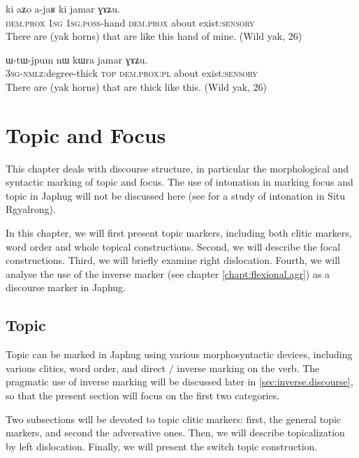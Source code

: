 \documentclass[oldfontcommands,oneside,a4paper,11pt]{memoir}
\newcommand{\ipa}[1]{{\phon #1}} %
\begin{document}
\begin{exe}
   \ex  \label{ex:ki.jamar2}
   \gll
\ipa{ki}   	\ipa{aʑo}   	\ipa{a-jaʁ}   	\ipa{ki}   	\ipa{jamar}   	\ipa{ɣɤʑu.}   \\
   \textsc{dem.prox}    \textsc{1sg} \textsc{1sg.poss}-hand   \textsc{dem.prox} about exist:\textsc{sensory} \\
\glt There are (yak horns) that are like this hand of mine. (Wild yak, 26)
\end{exe}
\begin{exe}
   \ex  \label{ex:ki.jamar3}
   \gll
\ipa{ɯ-tɯ-jpum}   	\ipa{nɯ}   	\ipa{kɯra}   	\ipa{jamar}   	\ipa{ɣɤʑu.}     \\
   \textsc{3sg-nmlz}:degree-thick \textsc{top} \textsc{dem.prox:pl} about    exist:\textsc{sensory} \\
\glt There are (yak horns) that are thick like this. (Wild yak, 26)
\end{exe}

\chapter{Topic and Focus} \label{chapt:discourse} 
This chapter deals with discourse structure, in particular the morphological and syntactic marking of topic and focus. The use of intonation in marking focus and topic in Japhug will not be discussed here (see \citet{lin09phd} for a study of intonation in Situ Rgyalrong).

In this chapter, we will first present topic markers, including both clitic markers, word order and whole topical constructions. Second, we will describe the focal constructions. Third, we will briefly examine right dislocation. Fourth, we will analyse the use of the inverse marker (see chapter \ref{chapt:flexional.agr}) as a discourse marker in Japhug.

\section{Topic} \label{sec:topic}

Topic can be marked in Japhug using various morphosyntactic devices, including various clitics, word order, and direct / inverse marking on the verb. The pragmatic use of inverse marking will  be discussed later in \ref{sec:inverse.discourse}, so that the present section will focus on the first two categories. 

Two subsections will be devoted to topic clitic markers: first, the general topic markers, and second the adversative ones. Then, we will describe  topicalization by left dislocation. Finally, we will present the switch topic construction.
\end{document}
